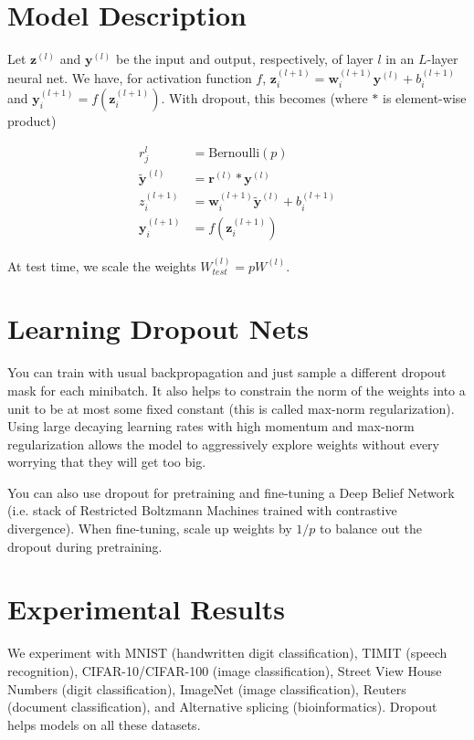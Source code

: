 \documentclass[a4paper]{article}
\begin{document}
\section{Model Description}
Let $\bm{z}^{(l)}$ and $\bm{y}^{(l)}$ be the input and output, respectively, of
layer $l$ in an $L$-layer neural net. We have, for activation function $f$,
$\bm{z}_i^{(l+1)} = \bm{w}_i^{(l+1)} \bm{y}^{(l)} + b_i^{(l+1)}$ and
$\bm{y}_i^{(l+1)} = f(\bm{z}_i^{(l+1)})$. With dropout, this becomes (where
$*$ is element-wise product)

\begin{align}
  r_j^l &= \text{Bernoulli}(p) \\
  \tilde{\bm{y}}^{(l)} &= \bm{r}^{(l)} * \bm{y}^{(l)} \\
  z_i^{(l+1)} &= \bm{w}_i^{(l+1)} \tilde{\bm{y}}^{(l)} + b_i^{(l+1)} \\
  \bm{y}_i^{(l+1)} &= f(\bm{z}_i^{(l+1)})
\end{align}

At test time, we scale the weights $W_{test}^{(l)} = pW^{(l)}$.

\section{Learning Dropout Nets}
You can train with usual backpropagation and just sample a different dropout
mask for each minibatch. It also helps to constrain the norm of the weights into
a unit to be at most some fixed constant (this is called max-norm
regularization). Using large decaying learning rates with high momentum and
max-norm regularization allows the model to aggressively explore weights without
every worrying that they will get too big.

You can also use dropout for pretraining and fine-tuning a Deep Belief Network
(i.e. stack of Restricted Boltzmann Machines trained with contrastive
divergence). When fine-tuning, scale up weights by $1/p$ to balance out the
dropout during pretraining.

\section{Experimental Results}
We experiment with MNIST (handwritten digit classification), TIMIT (speech
recognition), CIFAR-10/CIFAR-100 (image classification), Street View House
Numbers (digit classification), ImageNet (image classification), Reuters
(document classification), and Alternative splicing (bioinformatics).
Dropout helps models on all these datasets.
\end{document}
